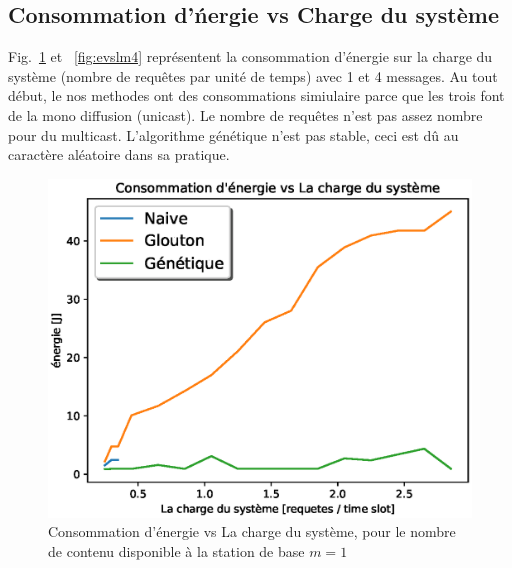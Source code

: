 \documentclass[runningheads]{llncs}
\begin{document}
\subsection{Consommation d'\'nergie vs Charge du syst\`eme}
Fig.~\ref{fig:evslm1} et ~\ref{fig:evslm4}  repr\'esentent la consommation d'énergie sur 
la charge du système (nombre de requêtes par unit\'e de temps) avec 1 et 4 messages.
Au tout début, le nos methodes ont des consommations simiulaire parce que les
trois font de la mono diffusion (unicast). Le nombre de requêtes n'est pas 
assez nombre pour du multicast.
L'algorithme g\'en\'etique n'est pas stable, ceci est dû au caract\`ere 
aléatoire dans sa pratique.
\begin{figure}[H]
    
    \includegraphics[width=\textwidth]{EvsL1.eps}
    \caption{Consommation d'énergie vs La charge du système, pour 
    le nombre de contenu disponible \`a la station de base $m=1$} 
    \label{fig:evslm1}
\end{figure}
\end{document}
